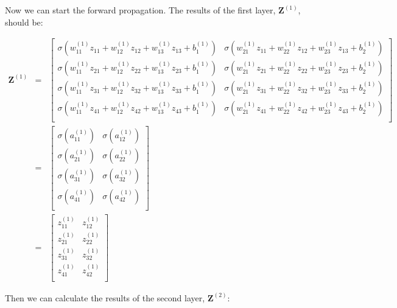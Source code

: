 \documentclass{article}
\begin{document}
\noindent Now we can start the forward propagation. The results of the first layer,
$\mathbf{Z}^{(1)}$, should be:

\begin{eqnarray}
\mathbf{Z}^{(1)} 
& = & \left[\begin{array}{ccc}
	\sigma(w^{(1)}_{11}z_{11} + w^{(1)}_{12}z_{12} + w^{(1)}_{13}z_{13} + b^{(1)}_1) &
	\sigma(w^{(1)}_{21}z_{11} + w^{(1)}_{22}z_{12} + w^{(1)}_{23}z_{13} + b^{(1)}_2) \\
	\sigma(w^{(1)}_{11}z_{21} + w^{(1)}_{12}z_{22} + w^{(1)}_{13}z_{23} + b^{(1)}_1) &
	\sigma(w^{(1)}_{21}z_{21} + w^{(1)}_{22}z_{22} + w^{(1)}_{23}z_{23} + b^{(1)}_2) \\
	\sigma(w^{(1)}_{11}z_{31} + w^{(1)}_{12}z_{32} + w^{(1)}_{13}z_{33} + b^{(1)}_1) &
	\sigma(w^{(1)}_{21}z_{31} + w^{(1)}_{22}z_{32} + w^{(1)}_{23}z_{33} + b^{(1)}_2) \\
	\sigma(w^{(1)}_{11}z_{41} + w^{(1)}_{12}z_{42} + w^{(1)}_{13}z_{43} + b^{(1)}_1) &
	\sigma(w^{(1)}_{21}z_{41} + w^{(1)}_{22}z_{42} + w^{(1)}_{23}z_{43} + b^{(1)}_2) \\
\end{array}
\right] \nonumber \\
& = & \left[\begin{array}{ccc}	
	\sigma(a^{(1)}_{11}) & \sigma(a^{(1)}_{12}) \\
	\sigma(a^{(1)}_{21}) & \sigma(a^{(1)}_{22}) \\
	\sigma(a^{(1)}_{31}) & \sigma(a^{(1)}_{32}) \\
	\sigma(a^{(1)}_{41}) & \sigma(a^{(1)}_{42}) \\
\end{array}
\right] \nonumber \\
& = & \left[\begin{array}{ccc}	
	z^{(1)}_{11} & z^{(1)}_{12} \\
	z^{(1)}_{21} & z^{(1)}_{22} \\
	z^{(1)}_{31} & z^{(1)}_{32} \\
	z^{(1)}_{41} & z^{(1)}_{42} \\
\end{array}
\right]
\end{eqnarray}

\noindent Then we can calculate the results of the second layer, $\mathbf{Z}^{(2)}$:
\end{document}
